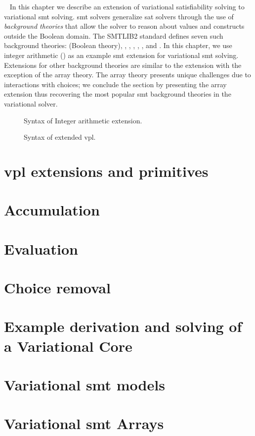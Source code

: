 ~\label{chapter:vsmt}
%
In this chapter we describe an extension of variational satisfiability solving
to variational \ac{smt} solving.
\ac{smt} solvers generalize \ac{sat} solvers through the use of \emph{background
  theories} that allow the solver to reason about values and constructs outside
the Boolean domain. The SMTLIB2 standard defines seven such background theories:
 (Boolean theory), , ,
, , , and . In this chapter,
we use integer arithmetic () as an example \ac{smt} extension for
variational \ac{smt} solving. Extensions for other background theories are
similar to the  extension with the exception of the array theory. The
array theory presents unique challenges due to interactions with choices; we
conclude the section by presenting the array extension thus recovering the most
popular \ac{smt} background theories in the variational solver.

\begin{figure}
  \centering
  
  \caption{Syntax of Integer arithmetic extension.}%
  \label{fig:arith:stx}
\end{figure}
%
\begin{figure}

\centering
\caption{Syntax of extended \ac{vpl}.}%
\label{fig:arith:vpl}
\end{figure}

\section{\ac{vpl} extensions and primitives}


\section{Accumulation}


\section{Evaluation}


\section{Choice removal}


\section{Example derivation and solving of a Variational Core}


\section{Variational \ac{smt} models}


\section{Variational \ac{smt} Arrays}



